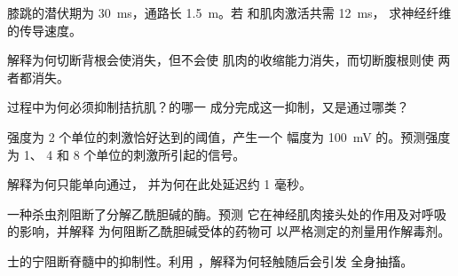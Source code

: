 \begin{exercise}[$\star\star$]\label{exo:g12:stretch-reflex:7}
膝跳的潜伏期为 \qty{30}{ms}，通路长 \qty{1.5}{m}。若
和肌肉激活共需 \qty{12}{ms}，
求神经纤维的传导速度。
\end{exercise}

\begin{exercise}[$\star\star$]\label{exo:g12:stretch-reflex:8}
解释为何切断背根会使消失，但不会使
肌肉的收缩能力消失，而切断腹根则使
两者都消失。
\end{exercise}

\begin{exercise}[$\star\star$]\label{exo:g12:stretch-reflex:9}
过程中为何必须抑制拮抗肌？的哪一
成分完成这一抑制，又是通过哪类？
\end{exercise}

\begin{exercise}[$\star\star$]\label{exo:g12:stretch-reflex:10}
强度为 2 个单位的刺激恰好达到的阈值，产生一个
幅度为 \qty{100}{mV} 的。预测强度为 1、
4 和 8 个单位的刺激所引起的信号。
\end{exercise}

\begin{exercise}[$\star\star$]\label{exo:g12:stretch-reflex:11}
解释为何只能单向通过，
并为何在此处延迟约 1 毫秒。
\end{exercise}

\begin{exercise}[$\star\star\star$]\label{exo:g12:stretch-reflex:12}
一种杀虫剂阻断了分解乙酰胆碱的酶。预测
它在神经肌肉接头处的作用及对呼吸的影响，并解释
为何阻断乙酰胆碱受体的药物可
以严格测定的剂量用作解毒剂。
\end{exercise}

\begin{exercise}[$\star\star\star$]\label{exo:g12:stretch-reflex:13}
士的宁阻断脊髓中的抑制性。利用
，解释为何轻触随后会引发
全身抽搐。
\end{exercise}

